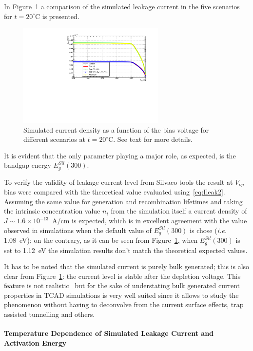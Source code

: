 In Figure~\ref{fig:ILeak20C} a comparison of the simulated leakage current in the five scenarios for $t=20^{\circ}$C is presented.
\begin{figure}[!htbp]
\centering
\includegraphics[width=0.65\textwidth]{currents_T20_scenarios.pdf}
\caption{\label{fig:ILeak20C}Simulated current density as a function of the bias voltage for different 
scenarios at $t=20^{\circ}$C. See text for more details.}
\end{figure}
It is evident that the only parameter playing a major role, as expected, is the bandgap energy $E^{Sil}_g(300)$. 



To verify the validity of leakage current level  from Silvaco tools the result at $V_{op}$ bias 
were compared with the theoretical value evaluated using~\ref{eq:Ileak2}. Assuming the same value
for generation and recombination lifetimes and taking the intrinsic concentration value $n_i$ from 
the simulation itself a current density of $J\sim1.6\times10^{-13}$~A/cm is expected, which 
is in excellent agreement with the value observed in simulations when the default value of 
$E^{Sil}_g(300)$ is chose ({\it i.e.} 1.08~eV); on the contrary, as it can be seen from Figure~\ref{fig:ILeak20C}, when $E^{Sil}_g(300)$ is set to 1.12~eV the simulation results don't match 
the theoretical expected values.

It has to be noted that  the simulated current is purely bulk generated; this is also clear from 
Figure~\ref{fig:ILeak20C}: the current level is stable after the depletion voltage. This feature 
is not realistic~\cite{CALZOLARI19721003} but for the sake of understating bulk generated 
current properties in TCAD simulations is very well suited since it allows to study the 
phenomenon without having to deconvolve from the current surface effects, trap assisted tunnelling 
and others.

\paragraph{Temperature Dependence of Simulated Leakage Current and Activation Energy}

